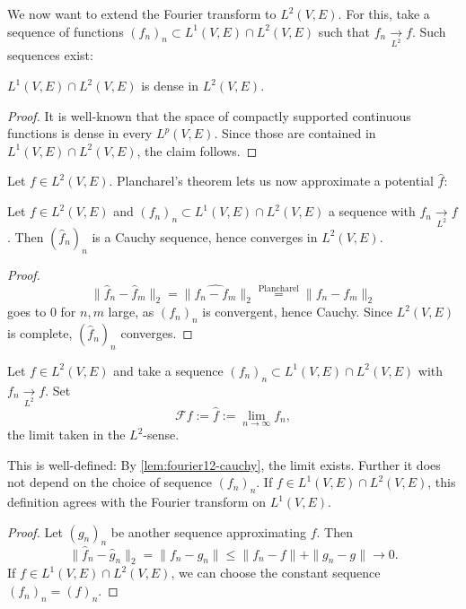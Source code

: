 We now want to extend the Fourier transform to $L^2(V,E)$. For this, take a sequence of functions $(f_n)_n\subset L^1(V,E)\cap L^2(V,E)$
such that $f_n\xrightarrow[L^2]{}f$. Such sequences exist:
\begin{lemma}
  \label{lem:L12-dense}
  \lean{}
  $L^1(V,E)\cap L^2(V,E)$ is dense in $L^2(V,E)$.
\end{lemma}
\begin{proof}
  It is well-known that the space of compactly supported continuous functions is dense in every $L^p(V,E)$.
  Since those are contained in $L^1(V,E)\cap L^2(V,E)$, the claim follows.
\end{proof}

Let $f\in L^2(V,E)$. Plancharel's theorem lets us now approximate a potential $\widehat f$:
\begin{lemma}
  \label{lem:fourier12-cauchy}
  \lean{}
  Let $f\in L^2(V,E)$ and $(f_n)_n\subset L^1(V,E)\cap L^2(V,E)$ a sequence with $f_n\xrightarrow[L^2]{}f$. Then $(\widehat f_n)_n$ is a Cauchy sequence,
  hence converges in $L^2(V,E)$.
\end{lemma}
\begin{proof}
  $$\|\widehat f_n-\widehat f_m\|_2=\|\widehat{f_n-f_m}\|_2\overset{\text{Plancharel}}=\|f_n-f_m\|_2$$ goes to $0$ for $n,m$ large, as $(f_n)_n$ is
  convergent, hence Cauchy. Since $L^2(V,E)$ is complete, $(\widehat f_n)_n$ converges.
\end{proof}
\begin{definition}
  \label{def:fourier-L2}
  \lean{}
  Let $f\in L^2(V,E)$ and take a sequence $(f_n)_n\subset L^1(V,E)\cap L^2(V,E)$ with $f_n\xrightarrow[L^2]{}f$. Set
  $$\mathcal Ff:=\widehat f:=\lim_{n\to\infty}\widehat{f_n},$$ the limit taken in the $L^2$-sense.
\end{definition}
\begin{lemma}
  \label{lem:fourier2-welldef}
  \lean{}
  This is well-defined: By \ref{lem:fourier12-cauchy}, the limit exists. Further it does not depend
  on the choice of sequence $(f_n)_n$. If $f\in L^1(V,E)\cap L^2(V,E)$, this definition agrees with
  the Fourier transform on $L^1(V,E)$.
\end{lemma}
\begin{proof}
  Let $(g_n)_n$ be another sequence approximating $f$. Then
  $$\|\widehat f_n-\widehat g_n\|_2=\|f_n-g_n\|\leq\|f_n-f\|+\|g_n-g\|\to0.$$
  If $f\in L^1(V,E)\cap L^2(V,E)$, we can choose the constant sequence $(f_n)_n=(f)_n$.
\end{proof}

